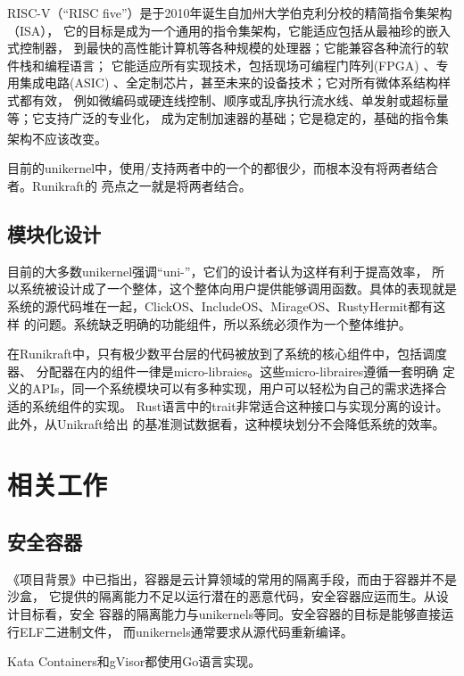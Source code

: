 \documentclass[UTF8,fontset=none,linespread=1.15]{ctexart}
\let\nosupcite\cite
\renewcommand*{\cite}[1]{\textsuperscript{\nosupcite{#1}}}
\begin{document}
RISC-V（“RISC five”）是于2010年诞生自加州大学伯克利分校的精简指令集架构（ISA），
它的目标是成为一个通用的指令集架构，它能适应包括从最袖珍的嵌入式控制器，
到最快的高性能计算机等各种规模的处理器；它能兼容各种流行的软件栈和编程语言；
它能适应所有实现技术，包括现场可编程门阵列(FPGA)
 、专用集成电路(ASIC) 、全定制芯片，甚至未来的设备技术；它对所有微体系结构样式都有效，
例如微编码或硬连线控制、顺序或乱序执行流水线、单发射或超标量等；它支持广泛的专业化，
成为定制加速器的基础；它是稳定的，基础的指令集架构不应该改变。\cite{bib:risc-v-manual}

目前的unikernel中，使用/支持两者中的一个的都很少，而根本没有将两者结合者。Runikraft的
亮点之一就是将两者结合。

\subsection{模块化设计}
目前的大多数unikernel强调“uni-”，它们的设计者认为这样有利于提高效率，
所以系统被设计成了一个整体，这个整体向用户提供能够调用函数。具体的表现就是
系统的源代码堆在一起，ClickOS、IncludeOS、MirageOS、RustyHermit都有这样
的问题。系统缺乏明确的功能组件，所以系统必须作为一个整体维护。

在Runikraft中，只有极少数平台层的代码被放到了系统的核心组件中，包括调度器、
分配器在内的组件一律是micro-libraies。这些micro-libraires遵循一套明确
定义的APIs，同一个系统模块可以有多种实现，用户可以轻松为自己的需求选择合适的系统组件的实现。
Rust语言中的trait非常适合这种接口与实现分离的设计。此外，从Unikraft给出
的基准测试数据看，这种模块划分不会降低系统的效率。

\section{相关工作}

\subsection{安全容器}
《项目背景》中已指出，容器是云计算领域的常用的隔离手段，而由于容器并不是沙盒，
它提供的隔离能力不足以运行潜在的恶意代码，安全容器应运而生。从设计目标看，安全
容器的隔离能力与unikernels等同。安全容器的目标是能够直接运行ELF二进制文件，
而unikernels通常要求从源代码重新编译。

Kata Containers和gVisor都使用Go语言实现。
\end{document}
